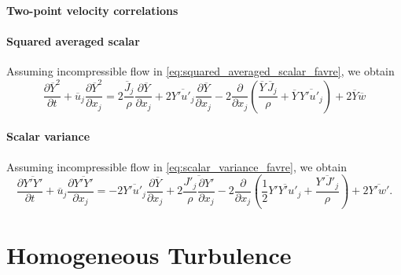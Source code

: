 \documentclass[oneside,a4paper,11pt]{report}
\newcommand{\uavg}{\overline{u}}
\newcommand{\wavg}{\overline{w}}
\newcommand{\Javg}{\overline{J}}
\newcommand{\Yavg}{\overline{Y}}
\newcommand{\ufluc}{u'}
\newcommand{\wfluc}{w'}
\newcommand{\Jfluc}{J'}
\newcommand{\Yfluc}{Y'}
\begin{document}
\subsection{Two-point velocity correlations}

\subsection{Squared averaged scalar}
Assuming incompressible flow in \cref{eq:squared_averaged_scalar_favre}, we obtain
\begin{equation}
    \frac{\partial \Yavg ^2}{\partial t} + \uavg_j \frac{\partial \Yavg^2}{\partial x_j} = 2\frac{ \Javg_j }{\rho} \frac{\partial \Yavg}{\partial x_j} + 2 \overline{ \Yfluc \ufluc_j } \frac{\partial \Yavg}{\partial x_j} - 2\frac{\partial}{\partial x_j} \left ( \frac{\Yavg \, \Javg_j }{\rho} + \Yavg \, \overline{ \Yfluc \ufluc_j } \right ) + 2 \Yavg \wavg
\end{equation}

\subsection{Scalar variance}
Assuming incompressible flow in \cref{eq:scalar_variance_favre}, we obtain 
\begin{equation}
    \label{eq:scalar_variance_rans}
    \frac{\partial \overline{ \Yfluc \Yfluc }}{\partial t} + \uavg_j \frac{\partial  \overline{ \Yfluc \Yfluc } }{\partial x_j} = -2 \overline{ \Yfluc \ufluc_j } \frac{\partial \Yavg}{\partial x_j} + 2 \overline{ \frac{\Jfluc_j}{\rho} \frac{\partial \Yfluc}{\partial x_j} } - 2 \frac{\partial}{\partial x_j} \left ( \frac{1}{2} \overline{ \Yfluc \Yfluc \ufluc_j } +  \frac{ \overline{ \Yfluc \Jfluc_j }}{\rho} \right) + 2 \overline{\Yfluc \wfluc}.
\end{equation}

\part{Homogeneous Turbulence}

\end{document}
